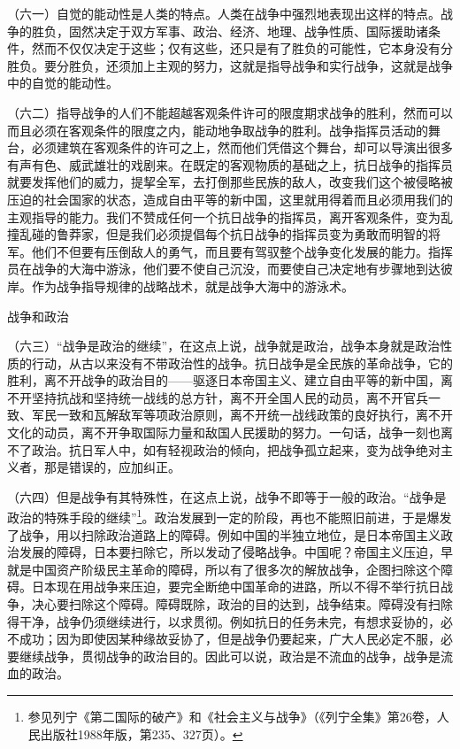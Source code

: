 \documentclass[UTF8, 12pt, a4paper]{ctexrep}
\begin{document}
（六一）自觉的能动性是人类的特点。人类在战争中强烈地表现出这样的特点。战争的胜负，固然决定于双方军事、政治、经济、地理、战争性质、国际援助诸条件，然而不仅仅决定于这些；仅有这些，还只是有了胜负的可能性，它本身没有分胜负。要分胜负，还须加上主观的努力，这就是指导战争和实行战争，这就是战争中的自觉的能动性。

（六二）指导战争的人们不能超越客观条件许可的限度期求战争的胜利，然而可以而且必须在客观条件的限度之内，能动地争取战争的胜利。战争指挥员活动的舞台，必须建筑在客观条件的许可之上，然而他们凭借这个舞台，却可以导演出很多有声有色、威武雄壮的戏剧来。在既定的客观物质的基础之上，抗日战争的指挥员就要发挥他们的威力，提挈全军，去打倒那些民族的敌人，改变我们这个被侵略被压迫的社会国家的状态，造成自由平等的新中国，这里就用得着而且必须用我们的主观指导的能力。我们不赞成任何一个抗日战争的指挥员，离开客观条件，变为乱撞乱碰的鲁莽家，但是我们必须提倡每个抗日战争的指挥员变为勇敢而明智的将军。他们不但要有压倒敌人的勇气，而且要有驾驭整个战争变化发展的能力。指挥员在战争的大海中游泳，他们要不使自己沉没，而要使自己决定地有步骤地到达彼岸。作为战争指导规律的战略战术，就是战争大海中的游泳术。

战争和政治

（六三）“战争是政治的继续”，在这点上说，战争就是政治，战争本身就是政治性质的行动，从古以来没有不带政治性的战争。抗日战争是全民族的革命战争，它的胜利，离不开战争的政治目的——驱逐日本帝国主义、建立自由平等的新中国，离不开坚持抗战和坚持统一战线的总方针，离不开全国人民的动员，离不开官兵一致、军民一致和瓦解敌军等项政治原则，离不开统一战线政策的良好执行，离不开文化的动员，离不开争取国际力量和敌国人民援助的努力。一句话，战争一刻也离不了政治。抗日军人中，如有轻视政治的倾向，把战争孤立起来，变为战争绝对主义者，那是错误的，应加纠正。

（六四）但是战争有其特殊性，在这点上说，战争不即等于一般的政治。“战争是政治的特殊手段的继续”\footnote{参见列宁《第二国际的破产》和《社会主义与战争》（《列宁全集》第26卷，人民出版社1988年版，第235、327页）。}。政治发展到一定的阶段，再也不能照旧前进，于是爆发了战争，用以扫除政治道路上的障碍。例如中国的半独立地位，是日本帝国主义政治发展的障碍，日本要扫除它，所以发动了侵略战争。中国呢？帝国主义压迫，早就是中国资产阶级民主革命的障碍，所以有了很多次的解放战争，企图扫除这个障碍。日本现在用战争来压迫，要完全断绝中国革命的进路，所以不得不举行抗日战争，决心要扫除这个障碍。障碍既除，政治的目的达到，战争结束。障碍没有扫除得干净，战争仍须继续进行，以求贯彻。例如抗日的任务未完，有想求妥协的，必不成功；因为即使因某种缘故妥协了，但是战争仍要起来，广大人民必定不服，必要继续战争，贯彻战争的政治目的。因此可以说，政治是不流血的战争，战争是流血的政治。
\end{document}
